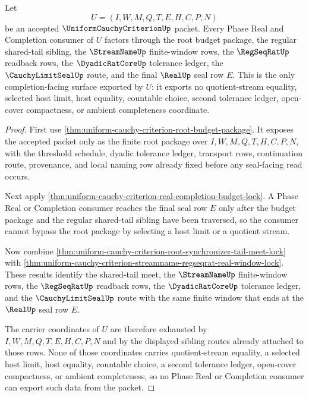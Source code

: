 \begin{theorem}
\label{thm:uniform-cauchy-criterion-real-seal-frontier-lock}
Let
$$
U=(I,W,M,Q,T,E,H,C,P,N)
$$
be an accepted $\UniformCauchyCriterionUp$ packet. Every Phase Real and Completion consumer of $U$ factors through the root budget package, the regular shared-tail sibling, the $\StreamNameUp$ finite-window rows, the $\RegSeqRatUp$ readback rows, the $\DyadicRatCoreUp$ tolerance ledger, the $\CauchyLimitSealUp$ route, and the final $\RealUp$ seal row $E$. This is the only completion-facing surface exported by $U$: it exports no quotient-stream equality, selected host limit, host equality, countable choice, second tolerance ledger, open-cover compactness, or ambient completeness coordinate.
\end{theorem}
\begin{proof}
First use \autoref{thm:uniform-cauchy-criterion-root-budget-package}. It exposes the accepted packet only as the finite root package over $I,W,M,Q,T,H,C,P,N$, with the threshold schedule, dyadic tolerance ledger, transport rows, continuation route, provenance, and local naming row already fixed before any seal-facing read occurs.

Next apply \autoref{thm:uniform-cauchy-criterion-real-completion-budget-lock}. A Phase Real or Completion consumer reaches the final seal row $E$ only after the budget package and the regular shared-tail sibling have been traversed, so the consumer cannot bypass the root package by selecting a host limit or a quotient stream.

Now combine \autoref{thm:uniform-cauchy-criterion-root-synchronizer-tail-meet-lock} with \autoref{thm:uniform-cauchy-criterion-streamname-regseqrat-real-window-lock}. These results identify the shared-tail meet, the $\StreamNameUp$ finite-window rows, the $\RegSeqRatUp$ readback rows, the $\DyadicRatCoreUp$ tolerance ledger, and the $\CauchyLimitSealUp$ route with the same finite window that ends at the $\RealUp$ seal row $E$.

The carrier coordinates of $U$ are therefore exhausted by $I,W,M,Q,T,E,H,C,P,N$ and by the displayed sibling routes already attached to those rows. None of those coordinates carries quotient-stream equality, a selected host limit, host equality, countable choice, a second tolerance ledger, open-cover compactness, or ambient completeness, so no Phase Real or Completion consumer can export such data from the packet.
\end{proof}

